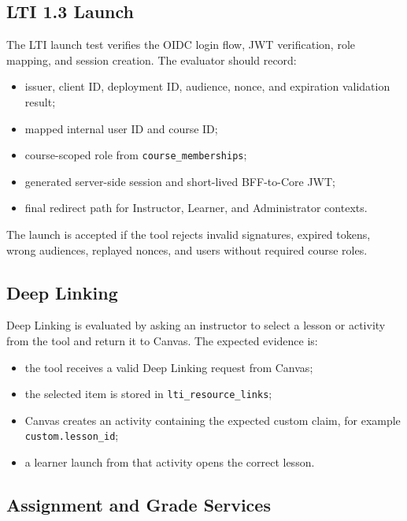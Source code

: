 \subsection{LTI 1.3 Launch}

The LTI launch test verifies the OIDC login flow, JWT verification, role
mapping, and session creation. The evaluator should record:

\begin{itemize}
    \item issuer, client ID, deployment ID, audience, nonce, and expiration
          validation result;
    \item mapped internal user ID and course ID;
    \item course-scoped role from \texttt{course\_memberships};
    \item generated server-side session and short-lived BFF-to-Core JWT;
    \item final redirect path for Instructor, Learner, and Administrator
          contexts.
\end{itemize}

The launch is accepted if the tool rejects invalid signatures, expired tokens,
wrong audiences, replayed nonces, and users without required course roles.

\subsection{Deep Linking}

Deep Linking is evaluated by asking an instructor to select a lesson or
activity from the tool and return it to Canvas. The expected evidence is:

\begin{itemize}
    \item the tool receives a valid Deep Linking request from Canvas;
    \item the selected item is stored in \texttt{lti\_resource\_links};
    \item Canvas creates an activity containing the expected custom claim, for
          example \texttt{custom.lesson\_id};
    \item a learner launch from that activity opens the correct lesson.
\end{itemize}

\subsection{Assignment and Grade Services}


